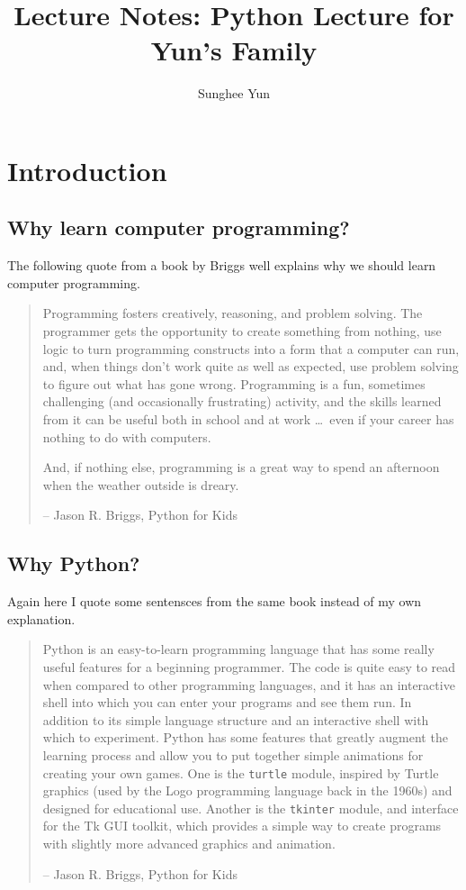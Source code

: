 \documentclass{article}
\title{Lecture Notes: Python Lecture for Yun's Family}
\author{Sunghee Yun}
\begin{document}
\maketitle

\tableofcontents

\newpage
\section{Introduction}

\subsection{Why learn computer programming?}

The following quote from a book by Briggs
well explains why we should learn computer programming.

\begin{quote}

Programming fosters creatively, reasoning, and problem solving.
The programmer gets the opportunity to create something from nothing, use logic to turn programming constructs into
a form that a computer can run, and, when things don't work quite as well as expected,
use problem solving to figure out what has gone wrong.
Programming is a fun, sometimes challenging
(and  occasionally frustrating) activity,
and the skills learned from it can be useful both in school and at work
\ldots\
even if your career has nothing to do with computers.

And, if nothing else, programming is a great way to spend an afternoon when the weather outside is dreary.

-- Jason R. Briggs, Python for Kids
\end{quote}

\nocite{JR:12}


\subsection{Why Python?}

Again here I quote some sentensces from the same book instead of my own explanation.

\begin{quote}
Python is an easy-to-learn programming language that has some really useful features for a beginning programmer.
The code is quite easy to read when compared to other programming languages,
and it has an interactive shell into which you can enter your programs and see them run.
In addition to its simple language structure and an interactive shell with which to experiment.
Python has some features that greatly augment the learning process
and allow you to put together simple animations for creating your own games.
One is the {\tt turtle} module, inspired by Turtle graphics
(used by the Logo programming language back in the 1960s)
and designed for educational use.
Another is the {\tt tkinter} module,
and interface for the Tk GUI toolkit,
which provides a simple way to create programs with slightly more advanced graphics and animation.

-- Jason R. Briggs, Python for Kids
\end{quote}
\end{document}
